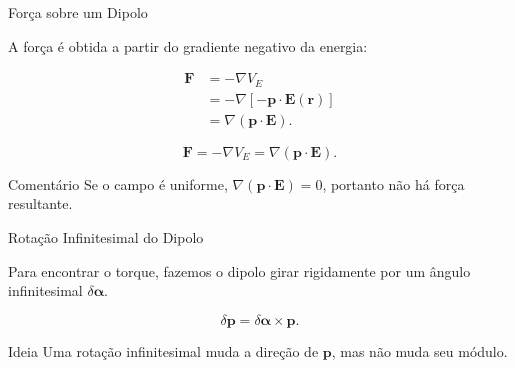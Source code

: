 \documentclass[aspectratio=169]{beamer}
\begin{document}
\begin{frame}{Força sobre um Dipolo}

A força é obtida a partir do gradiente negativo da energia:

\begin{align}
\mathbf F
&=
-\nabla V_E
\\[0.2cm]
&=
-\nabla\left[-\mathbf p\cdot \mathbf E(\mathbf r)\right]
\\[0.2cm]
&=
\nabla\left(\mathbf p\cdot \mathbf E\right).
\end{align}

\begin{eqbox}
\begin{equation}
\mathbf F
=
-\nabla V_E
=
\nabla(\mathbf p\cdot \mathbf E).
\tag{4.27}
\label{eq:4.27}
\end{equation}
\end{eqbox}

\begin{mybox}{Comentário}
Se o campo é uniforme, \(\nabla(\mathbf p\cdot \mathbf E)=0\), portanto não há força resultante.
\end{mybox}

\end{frame}

\begin{frame}{Rotação Infinitesimal do Dipolo}

Para encontrar o torque, fazemos o dipolo girar rigidamente por um ângulo
infinitesimal \(\delta\boldsymbol{\alpha}\).

\begin{eqbox}
\begin{equation}
\delta \mathbf p
=
\delta\boldsymbol{\alpha}\times \mathbf p.
\tag{4.28}
\label{eq:4.28}
\end{equation}
\end{eqbox}

\begin{mybox}{Ideia}
Uma rotação infinitesimal muda a direção de \(\mathbf p\), mas não muda seu módulo.
\end{mybox}

\end{frame}
\end{document}
